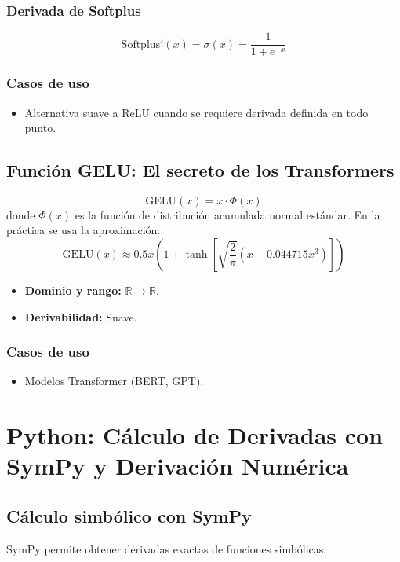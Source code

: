 \documentclass[12pt,a4paper,openany,oneside]{book}
\begin{document}
\subsubsection{Derivada de Softplus}
\[
\text{Softplus}'(x) = \sigma(x) = \frac{1}{1 + e^{-x}}
\]

\subsubsection{Casos de uso}
\begin{itemize}
    \item Alternativa suave a ReLU cuando se requiere derivada definida en todo punto.
\end{itemize}

\subsection{Función GELU: El secreto de los Transformers}

\begin{equation}
\text{GELU}(x) = x \cdot \Phi(x)
\end{equation}
donde $\Phi(x)$ es la función de distribución acumulada normal estándar. En la práctica se usa la aproximación:
\[
\text{GELU}(x) \approx 0.5x \left(1 + \tanh\left[\sqrt{\frac{2}{\pi}}\left(x + 0.044715 x^3\right)\right]\right)
\]

\begin{itemize}
    \item \textbf{Dominio y rango:} $\mathbb{R} \to \mathbb{R}$.
    \item \textbf{Derivabilidad:} Suave.
\end{itemize}

\subsubsection{Casos de uso}
\begin{itemize}
    \item Modelos Transformer (BERT, GPT).
\end{itemize}

\section{Python: Cálculo de Derivadas con SymPy y Derivación Numérica}

\subsection{Cálculo simbólico con SymPy}
SymPy permite obtener derivadas exactas de funciones simbólicas.
\end{document}
